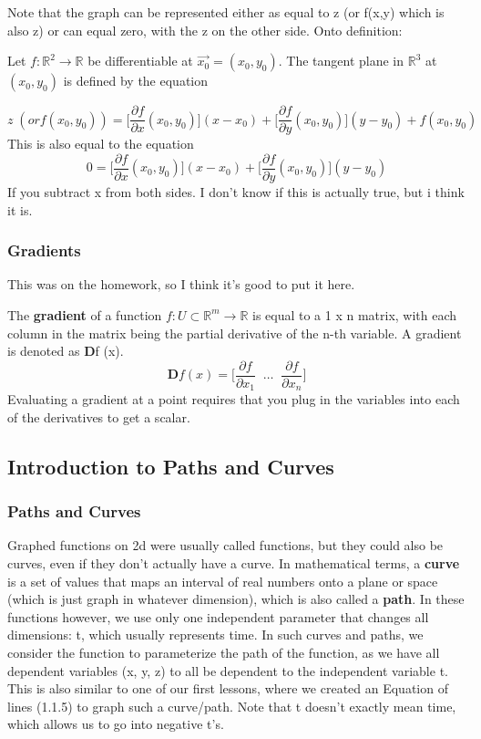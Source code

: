 \documentclass{article}
\begin{document}
Note that the graph can be represented either as equal to z (or f(x,y) which is also z) or can equal zero, with the z on the other side. Onto definition:\newline

Let $f: \mathbb{R}^2 \rightarrow \mathbb{R}$ be differentiable at $\vec{x_0} = (x_0, y_0)$. The tangent plane in $\mathbb{R}^3$ at $(x_0, y_0)$ is defined by the equation

\[
  z \; (or f(x_0,y_0)) = \bigg[\frac{\partial f}{\partial x}(x_0,y_0)\bigg](x - x_0) + \bigg[\frac{\partial f}{\partial y}(x_0,y_0)\bigg](y - y_0) + f(x_0,y_0)
\]
This is also equal to the equation 
\[
  0 = \bigg[\frac{\partial f}{\partial x}(x_0,y_0)\bigg](x - x_0) + \bigg[\frac{\partial f}{\partial y}(x_0,y_0)\bigg](y - y_0)
\]
If you subtract x from both sides. I don't know if this is actually true, but i think it is.

\subsubsection{Gradients}
This was on the homework, so I think it's good to put it here.\newline

The \textbf{gradient} of a function $f : U \subset \mathbb{R}^m \rightarrow \mathbb{R}$ is equal to a 1 x n matrix, with each column in the matrix being the partial derivative of the n-th variable. A gradient is denoted as 
\textbf{D}f (x).
\[
  \textbf{D}f(x) = \bigg[ \frac{\partial f}{\partial x_1}\; \;  \hdots \; \; \frac{\partial f}{\partial x_n} \bigg]
\]
Evaluating a gradient at a point requires that you plug in the variables into each of the derivatives to get a scalar.

\subsection{Introduction to Paths and Curves}
\subsubsection{Paths and Curves}
Graphed functions on 2d were usually called functions, but they could also be curves, even if they don't actually have a curve. In mathematical terms, a \textbf{curve} is a set of values that maps an interval of real numbers onto a plane or space (which is just graph in whatever dimension), which is also called a \textbf{path}. In these functions however, we use only one independent parameter that changes all dimensions: t, which usually represents time. In such curves and paths, we consider the function to parameterize the path of the function, as we have all dependent variables (x, y, z) to all be dependent to the independent variable t. This is also similar to one of our first lessons, where we created an Equation of lines (1.1.5) to graph such a curve/path. Note that t doesn't exactly mean time, which allows us to go into negative t's.\newline
\end{document}
